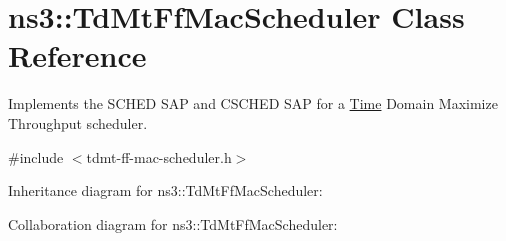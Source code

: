 \hypertarget{classns3_1_1TdMtFfMacScheduler}{}\section{ns3\+:\+:Td\+Mt\+Ff\+Mac\+Scheduler Class Reference}
\label{classns3_1_1TdMtFfMacScheduler}


Implements the S\+C\+H\+ED S\+AP and C\+S\+C\+H\+ED S\+AP for a \hyperlink{classns3_1_1Time}{Time} Domain Maximize Throughput scheduler.  




{\ttfamily \#include $<$tdmt-\/ff-\/mac-\/scheduler.\+h$>$}



Inheritance diagram for ns3\+:\+:Td\+Mt\+Ff\+Mac\+Scheduler\+:


Collaboration diagram for ns3\+:\+:Td\+Mt\+Ff\+Mac\+Scheduler\+:

